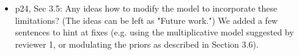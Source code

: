 \documentclass[12pt]{article}
\newcommand{\sresp}[1]{\textcolor{cobalt}{#1}}
\begin{document}
\begin{itemize}
\item p24, Sec 3.5: Any ideas how to modify the model to incorporate these
  limitations?  (The ideas can be left as "Future work.") \sresp{We added a few sentences to hint at fixes (e.g. using the multiplicative model suggested by reviewer 1, or modulating the priors as described in Section 3.6).}
\end{itemize}
\end{document}
